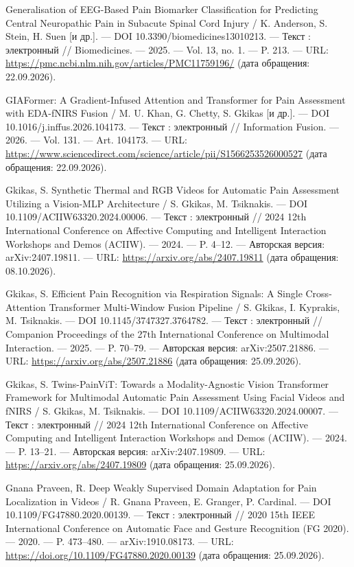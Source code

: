 \begin{list}{}{\setlength{\leftmargin}{10mm}\setlength{\labelwidth}{8mm}\setlength{\labelsep}{2mm}\setlength{\itemsep}{0pt}\setlength{\parsep}{0pt}\setlength{\topsep}{0pt}}
\item[137.] Generalisation of EEG-Based Pain Biomarker Classification for Predicting Central Neuropathic Pain in Subacute Spinal Cord Injury / K. Anderson, S. Stein, H. Suen [и др.]. — DOI 10.3390/biomedicines13010213. — Текст : электронный // Biomedicines. — 2025. — Vol. 13, no. 1. — P. 213. — URL: \url{https://pmc.ncbi.nlm.nih.gov/articles/PMC11759196/} (дата обращения: 22.09.2026).
\item[138.] GIAFormer: A Gradient-Infused Attention and Transformer for Pain Assessment with EDA-fNIRS Fusion / M. U. Khan, G. Chetty, S. Gkikas [и др.]. — DOI 10.1016/j.inffus.2026.104173. — Текст : электронный // Information Fusion. — 2026. — Vol. 131. — Art. 104173. — URL: \url{https://www.sciencedirect.com/science/article/pii/S1566253526000527} (дата обращения: 22.09.2026).
\item[139.] Gkikas, S. Synthetic Thermal and RGB Videos for Automatic Pain Assessment Utilizing a Vision-MLP Architecture / S. Gkikas, M. Tsiknakis. — DOI 10.1109/ACIIW63320.2024.00006. — Текст : электронный // 2024 12th International Conference on Affective Computing and Intelligent Interaction Workshops and Demos (ACIIW). — 2024. — P. 4–12. — Авторская версия: arXiv:2407.19811. — URL: \url{https://arxiv.org/abs/2407.19811} (дата обращения: 08.10.2026).
\item[140.] Gkikas, S. Efficient Pain Recognition via Respiration Signals: A Single Cross-Attention Transformer Multi-Window Fusion Pipeline / S. Gkikas, I. Kyprakis, M. Tsiknakis. — DOI 10.1145/3747327.3764782. — Текст : электронный // Companion Proceedings of the 27th International Conference on Multimodal Interaction. — 2025. — P. 70–79. — Авторская версия: arXiv:2507.21886. — URL: \url{https://arxiv.org/abs/2507.21886} (дата обращения: 25.09.2026).
\item[141.] Gkikas, S. Twins-PainViT: Towards a Modality-Agnostic Vision Transformer Framework for Multimodal Automatic Pain Assessment Using Facial Videos and fNIRS / S. Gkikas, M. Tsiknakis. — DOI 10.1109/ACIIW63320.2024.00007. — Текст : электронный // 2024 12th International Conference on Affective Computing and Intelligent Interaction Workshops and Demos (ACIIW). — 2024. — P. 13–21. — Авторская версия: arXiv:2407.19809. — URL: \url{https://arxiv.org/abs/2407.19809} (дата обращения: 25.09.2026).
\item[142.] Gnana Praveen, R. Deep Weakly Supervised Domain Adaptation for Pain Localization in Videos / R. Gnana Praveen, E. Granger, P. Cardinal. — DOI 10.1109/FG47880.2020.00139. — Текст : электронный // 2020 15th IEEE International Conference on Automatic Face and Gesture Recognition (FG 2020). — 2020. — P. 473–480. — arXiv:1910.08173. — URL: \url{https://doi.org/10.1109/FG47880.2020.00139} (дата обращения: 25.09.2026).

\end{list}
